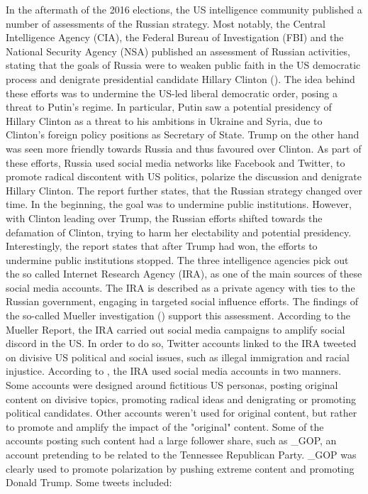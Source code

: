 \documentclass[12pt, authoryear]{elsarticle}
\begin{document}
In the aftermath of the 2016 elections, the US intelligence community published a number of assessments of the Russian strategy. Most notably, the Central Intelligence Agency (CIA), the Federal Bureau of Investigation (FBI) and the National Security Agency (NSA) published an assessment of Russian activities, stating that the goals of Russia were to weaken public faith in the US democratic process and denigrate presidential candidate Hillary Clinton (\cite{office2017assessing}). The idea behind these efforts was to undermine the US-led liberal democratic order, posing a threat to Putin's regime. In particular, Putin saw a potential presidency of Hillary Clinton as a threat to his ambitions in Ukraine and Syria, due to Clinton's foreign policy positions as Secretary of State. Trump on the other hand was seen more friendly towards Russia and thus favoured over Clinton. As part of these efforts, Russia used social media networks like Facebook and Twitter, to promote radical discontent with US politics, polarize the discussion and denigrate Hillary Clinton. The report further states, that the Russian strategy changed over time. In the beginning, the goal was to undermine public institutions. However, with Clinton leading over Trump, the Russian efforts shifted towards the defamation of Clinton, trying to harm her electability and potential presidency. Interestingly, the report states that after Trump had won, the efforts to undermine public institutions stopped. The three intelligence agencies pick out the so called Internet Research Agency (IRA), as one of the main sources of these social media accounts. The IRA is described as a private agency with ties to the Russian government, engaging in targeted social influence efforts.
The findings of the so-called Mueller investigation (\cite{mueller2019report}) support this assessment. According to the Mueller Report, the IRA carried out social media campaigns to amplify social discord in the US. In order to do so, Twitter accounts linked to the IRA tweeted on divisive US political and social issues, such as illegal immigration and racial injustice. According to \cite{mueller2019report}, the IRA used social media accounts in two manners. Some accounts were designed around fictitious US personas, posting original content on divisive topics, promoting radical ideas and denigrating or promoting political candidates. Other accounts weren't used for original content, but rather to promote and amplify the impact of the "original" content. Some of the  accounts posting such content had a large follower share, such as \@TEN\_GOP, an account pretending to be related to the Tennessee Republican Party. \@TEN\_GOP was clearly used to promote polarization by pushing extreme content and promoting Donald Trump. Some tweets included:  
\end{document}
